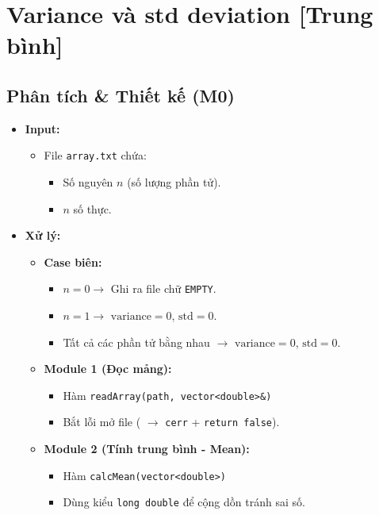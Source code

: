 \section{Variance và std deviation [Trung bình]}
\subsection{Phân tích \& Thiết kế (M0)}
    \begin{itemize}
    \item \textbf{Input:}
        \begin{itemize}
            \item File \texttt{array.txt} chứa:
            \begin{itemize}
                \item Số nguyên $n$ (số lượng phần tử).
                \item $n$ số thực.
            \end{itemize}
        \end{itemize}

    \item \textbf{Xử lý:}
        \begin{itemize}
            \item \textbf{Case biên:}
            \begin{itemize}
                \item $n = 0 \rightarrow$ Ghi ra file chữ \texttt{EMPTY}.
                \item $n = 1 \rightarrow$ $\text{variance} = 0$, $\text{std} = 0$.
                \item Tất cả các phần tử bằng nhau $\rightarrow$ $\text{variance} = 0$, $\text{std} = 0$.
            \end{itemize}
            
            \item \textbf{Module 1 (Đọc mảng):}
            \begin{itemize}
                \item Hàm \texttt{readArray(path, vector<double>\&)}
                \item Bắt lỗi mở file ( $\rightarrow$ \texttt{cerr} + \texttt{return false}).
            \end{itemize}

            \item \textbf{Module 2 (Tính trung bình - Mean):}
            \begin{itemize}
                \item Hàm \texttt{calcMean(vector<double>)}
                \item Dùng kiểu \texttt{long double} để cộng dồn tránh sai số.
            \end{itemize}
            

\end{itemize}
\end{itemize}
